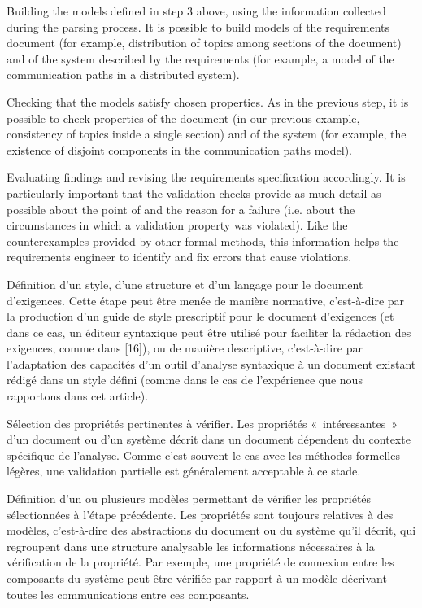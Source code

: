 {{    \item[][---] Building the models defined in step 3 above, using the information collected during the parsing process. It is possible to build models of the requirements document (for example, distribution of topics among sections of the document) and of the system described by the requirements (for example, a model of the communication paths in a distributed system).
    \item[][---] Checking that the models satisfy chosen properties. As in the previous step, it is possible to check properties of the document (in our previous example, consistency of topics inside a single section) and of the system (for example, the existence of disjoint components in the communication paths model).
    \item[][---] Evaluating findings and revising the requirements specification accordingly. It is particularly important that the validation checks provide as much detail as possible about the point of and the reason for a failure (i.e. about the circumstances in which a validation property was violated). Like the counterexamples provided by other formal methods, this information helps the requirements engineer to identify and fix errors that cause violations.
} {
    \item[][---] Définition d'un style, d'une structure et d'un langage pour le document d'exigences. Cette étape peut être menée de manière normative, c'est-à-dire par la production d'un guide de style prescriptif pour le document d'exigences (et dans ce cas, un éditeur syntaxique peut être utilisé pour faciliter la rédaction des exigences, comme dans [16]), ou de manière descriptive, c'est-à-dire par l'adaptation des capacités d'un outil d'analyse syntaxique à un document existant rédigé dans un style défini (comme dans le cas de l'expérience que nous rapportons dans cet article).
    \item[][---] Sélection des propriétés pertinentes à vérifier. Les propriétés «~intéressantes~» d'un document ou d'un système décrit dans un document dépendent du contexte spécifique de l'analyse. Comme c'est souvent le cas avec les méthodes formelles légères, une validation partielle est généralement acceptable à ce stade.
    \item[][---] Définition d'un ou plusieurs modèles permettant de vérifier les propriétés sélectionnées à l'étape précédente. Les propriétés sont toujours relatives à des modèles, c'est-à-dire des abstractions du document ou du système qu'il décrit, qui regroupent dans une structure analysable les informations nécessaires à la vérification de la propriété. Par exemple, une propriété de connexion entre les composants du système peut être vérifiée par rapport à un modèle décrivant toutes les communications entre ces composants.
}}
